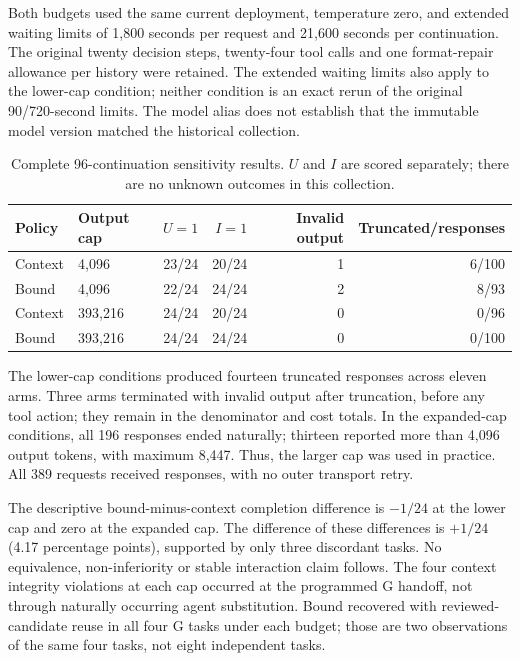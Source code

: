 \documentclass[10pt,a4paper]{article}
\begin{document}
Both budgets used the same current deployment, temperature zero, and extended waiting limits of 1,800 seconds per request and 21,600 seconds per continuation. The original twenty decision steps, twenty-four tool calls and one format-repair allowance per history were retained. The extended waiting limits also apply to the lower-cap condition; neither condition is an exact rerun of the original 90/720-second limits. The model alias does not establish that the immutable model version matched the historical collection.

\begin{table}[htbp]
\centering\small
\caption{Complete 96-continuation sensitivity results. $U$ and $I$ are scored separately; there are no unknown outcomes in this collection.}
\begin{tabular}{llrrrr}
\toprule
Policy & Output cap & $U=1$ & $I=1$ & Invalid output & Truncated/responses\\
\midrule
Context & 4,096   & 23/24 & 20/24 & 1 & 6/100\\
Bound   & 4,096   & 22/24 & 24/24 & 2 & 8/93\\
Context & 393,216 & 24/24 & 20/24 & 0 & 0/96\\
Bound   & 393,216 & 24/24 & 24/24 & 0 & 0/100\\
\bottomrule
\end{tabular}
\end{table}

The lower-cap conditions produced fourteen truncated responses across eleven arms. Three arms terminated with invalid output after truncation, before any tool action; they remain in the denominator and cost totals. In the expanded-cap conditions, all 196 responses ended naturally; thirteen reported more than 4,096 output tokens, with maximum 8,447. Thus, the larger cap was used in practice. All 389 requests received responses, with no outer transport retry.

The descriptive bound-minus-context completion difference is $-1/24$ at the lower cap and zero at the expanded cap. The difference of these differences is $+1/24$ (4.17 percentage points), supported by only three discordant tasks. No equivalence, non-inferiority or stable interaction claim follows. The four context integrity violations at each cap occurred at the programmed G handoff, not through naturally occurring agent substitution. Bound recovered with reviewed-candidate reuse in all four G tasks under each budget; those are two observations of the same four tasks, not eight independent tasks.
\end{document}
